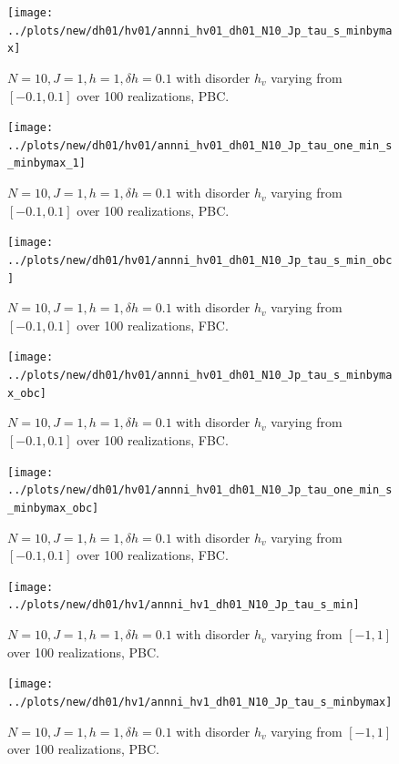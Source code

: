 \documentclass[a4paper]{article}
\begin{document}
\begin{figure}[h!]
  \centering
  \texttt{[image: ../plots/new/dh01/hv01/annni\_hv01\_dh01\_N10\_Jp\_tau\_s\_minbymax]}
  \caption{$N = 10, J = 1, h = 1, \delta h=0.1$ with disorder $h_v$ varying from $[-0.1,0.1]$ over 100 realizations, PBC.}
  \label{fig:}
\end{figure}

\begin{figure}[h!]
  \centering
  \texttt{[image: ../plots/new/dh01/hv01/annni\_hv01\_dh01\_N10\_Jp\_tau\_one\_min\_s\_minbymax\_1]}
  \caption{$N = 10, J = 1, h = 1, \delta h=0.1$ with disorder $h_v$ varying from $[-0.1,0.1]$ over 100 realizations, PBC.}
  \label{fig:}
\end{figure}

\begin{figure}[h!]
  \centering
  \texttt{[image: ../plots/new/dh01/hv01/annni\_hv01\_dh01\_N10\_Jp\_tau\_s\_min\_obc]}
  \caption{$N = 10, J = 1, h = 1, \delta h=0.1$ with disorder $h_v$ varying from $[-0.1,0.1]$ over 100 realizations, FBC.}
  \label{fig:}
\end{figure}

\begin{figure}[h!]
  \centering
  \texttt{[image: ../plots/new/dh01/hv01/annni\_hv01\_dh01\_N10\_Jp\_tau\_s\_minbymax\_obc]}
  \caption{$N = 10, J = 1, h = 1, \delta h=0.1$ with disorder $h_v$ varying from $[-0.1,0.1]$ over 100 realizations, FBC.}
  \label{fig:}
\end{figure}

\begin{figure}[h!]
  \centering
  \texttt{[image: ../plots/new/dh01/hv01/annni\_hv01\_dh01\_N10\_Jp\_tau\_one\_min\_s\_minbymax\_obc]}
  \caption{$N = 10, J = 1, h = 1, \delta h=0.1$ with disorder $h_v$ varying from $[-0.1,0.1]$ over 100 realizations, FBC.}
  \label{fig:}
\end{figure}

\begin{figure}[h!]
  \centering
  \texttt{[image: ../plots/new/dh01/hv1/annni\_hv1\_dh01\_N10\_Jp\_tau\_s\_min]}
  \caption{$N = 10, J = 1, h = 1, \delta h=0.1$ with disorder $h_v$ varying from $[-1,1]$ over 100 realizations, PBC.}
  \label{fig:}
\end{figure}

\begin{figure}[h!]
  \centering
  \texttt{[image: ../plots/new/dh01/hv1/annni\_hv1\_dh01\_N10\_Jp\_tau\_s\_minbymax]}
  \caption{$N = 10, J = 1, h = 1, \delta h=0.1$ with disorder $h_v$ varying from $[-1,1]$ over 100 realizations, PBC.}
  \label{fig:}
\end{figure}
\end{document}
